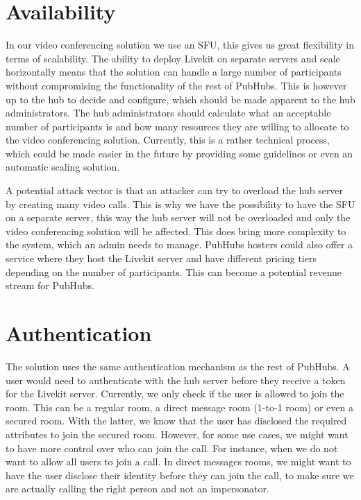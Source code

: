\documentclass{report}
\begin{document}
\section{Availability}
In our video conferencing solution we use an SFU, this gives us great flexibility in terms of scalability. The
ability to deploy Livekit on separate servers and scale horizontally means that the solution can handle a large
number of participants without compromising the functionality of the rest of PubHubs. This is however up to the hub
to decide and configure, which should be made apparent to the hub administrators. The hub administrators should
calculate what an acceptable number of participants is and how many resources they are willing to allocate to the
video conferencing solution. Currently, this is a rather technical process, which could be made easier in the future
by providing some guidelines or even an automatic scaling solution.

A potential attack vector is that an attacker can try to overload the hub server by creating many video calls. This
is why we have the possibility to have the SFU on a separate server, this way the hub server will not be overloaded
and only the video conferencing solution will be affected. This does bring more complexity to the system, which an
admin needs to manage. PubHubs hosters could also offer a service where they host the Livekit server and have different
pricing tiers depending on the number of participants. This can become a potential revenue stream for PubHubs.

\section{Authentication}
The solution uses the same authentication mechanism as the rest of PubHubs. A user would need to authenticate with the
hub server before they receive a token for the Livekit server. Currently, we only check if the user is allowed to
join the room. This can be a regular room, a direct message room (1-to-1 room) or even a secured room. With the latter, we know that the user has
disclosed the required attributes to join the secured room. However, for some use cases, we might want to have more
control over who can join the call. For instance, when we do not want to allow all users to join a call. In direct
messages rooms, we might want to have the user disclose their identity before they can join the call, to
make sure we are actually calling the right person and not an impersonator.
\end{document}
